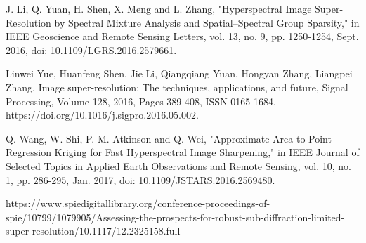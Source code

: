 J. Li, Q. Yuan, H. Shen, X. Meng and L. Zhang, "Hyperspectral Image Super-Resolution by Spectral Mixture Analysis and Spatial–Spectral Group Sparsity," in IEEE Geoscience and Remote Sensing Letters, vol. 13, no. 9, pp. 1250-1254, Sept. 2016, doi: 10.1109/LGRS.2016.2579661.

Linwei Yue, Huanfeng Shen, Jie Li, Qiangqiang Yuan, Hongyan Zhang, Liangpei Zhang, Image super-resolution: The techniques, applications, and future, Signal Processing, Volume 128, 2016, Pages 389-408, ISSN 0165-1684, https://doi.org/10.1016/j.sigpro.2016.05.002.

Q. Wang, W. Shi, P. M. Atkinson and Q. Wei, "Approximate Area-to-Point Regression Kriging for Fast Hyperspectral Image Sharpening," in IEEE Journal of Selected Topics in Applied Earth Observations and Remote Sensing, vol. 10, no. 1, pp. 286-295, Jan. 2017, doi: 10.1109/JSTARS.2016.2569480.

https://www.spiedigitallibrary.org/conference-proceedings-of-spie/10799/1079905/Assessing-the-prospects-for-robust-sub-diffraction-limited-super-resolution/10.1117/12.2325158.full